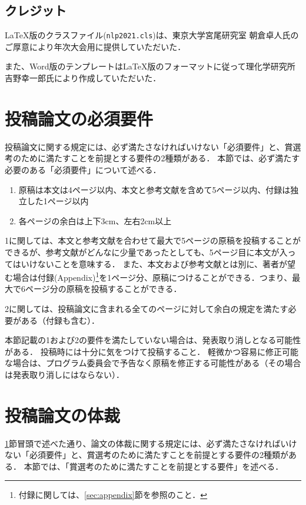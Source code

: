 \documentclass[
  platex, dvipdfmx,  %
]{nlp2021}
\newcommand{\code}[1]{\texttt{#1}}
\begin{document}
\subsection{クレジット}
LaTeX版のクラスファイル(\code{nlp2021.cls})は、東京大学宮尾研究室 朝倉卓人氏のご厚意により年次大会用に提供していただいた．

また、Word版のテンプレートはLaTeX版のフォーマットに従って理化学研究所 吉野幸一郎氏により作成していただいた．




\section{投稿論文の必須要件}
\label{sec:contents-format1}

投稿論文に関する規定には、必ず満たさなければいけない「必須要件」と、賞選考のために満たすことを前提とする要件の2種類がある．
本節では、必ず満たす必要のある「必須要件」について述べる．

\begin{enumerate}
\item 原稿は本文は4ページ以内、本文と参考文献を含めて5ページ以内、付録は独立した1ページ以内
\item 各ページの余白は上下3cm、左右2cm以上
\end{enumerate}

1に関しては、本文と参考文献を合わせて最大で5ページの原稿を投稿することができるが、参考文献がどんなに少量であったとしても、5ページ目に本文が入ってはいけないことを意味する．
また、本文および参考文献とは別に、著者が望む場合は付録(Appendix)\footnote{付録に関しては、\ref{sec:appendix}節を参照のこと．}を1ページ分、原稿につけることができる．つまり、最大で6ページ分の原稿を投稿することができる．




2に関しては、投稿論文に含まれる全てのページに対して余白の規定を満たす必要がある（付録も含む）．

本節記載の1および2の要件を満たしていない場合は、発表取り消しとなる可能性がある．
投稿時には十分に気をつけて投稿すること．
軽微かつ容易に修正可能な場合は、プログラム委員会で予告なく原稿を修正する可能性がある（その場合は発表取り消しにはならない）．



\section{投稿論文の体裁}
\label{sec:contents-format2}
\ref{sec:contents-format1}節冒頭で述べた通り、論文の体裁に関する規定には、必ず満たさなければいけない「必須要件」と、賞選考のために満たすことを前提とする要件の2種類がある．
本節では、「賞選考のために満たすことを前提とする要件」を述べる．
\end{document}
